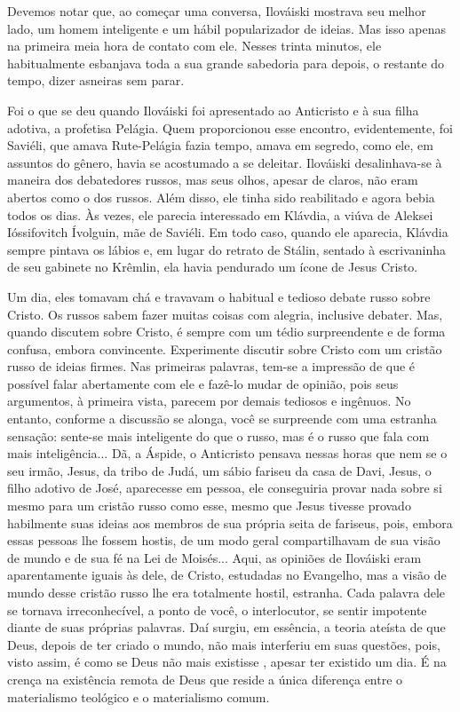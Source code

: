 Devemos notar que, ao começar uma conversa, Ilováiski mostrava seu
melhor lado, um homem inteligente e um hábil popularizador de ideias.
Mas isso apenas na primeira meia hora de contato com ele. Nesses trinta
minutos, ele habitualmente esbanjava toda a sua grande sabedoria para
depois, o restante do tempo, dizer asneiras sem parar.

Foi o que se deu quando Ilováiski foi apresentado ao Anticristo e à sua
filha adotiva, a profetisa Pelágia. Quem proporcionou esse encontro,
evidentemente, foi Saviéli, que amava Rute-Pelágia fazia tempo, amava em
segredo, como ele, em assuntos do gênero, havia se acostumado a se
deleitar. Ilováiski desalinhava-se à maneira dos debatedores russos, mas
seus olhos, apesar de claros, não eram abertos como o dos russos. Além
disso, ele tinha sido reabilitado e agora bebia todos os dias. Às vezes,
ele parecia interessado em Klávdia, a viúva de Aleksei Ióssifovitch
Ívolguin, mãe de Saviéli. Em todo caso, quando ele aparecia, Klávdia
sempre pintava os lábios e, em lugar do retrato de Stálin, sentado à
escrivaninha de seu gabinete no Krêmlin, ela havia pendurado um ícone de
Jesus Cristo.

Um dia, eles tomavam chá e travavam o habitual e tedioso debate russo
sobre Cristo. Os russos sabem fazer muitas coisas com alegria, inclusive
debater. Mas, quando discutem sobre Cristo, é sempre com um tédio
surpreendente e de forma confusa, embora convincente. Experimente
discutir sobre Cristo com um cristão russo de ideias firmes. Nas
primeiras palavras, tem-se a impressão de que é possível falar
abertamente com ele e fazê-lo mudar de opinião, pois seus argumentos, à
primeira vista, parecem por demais tediosos e ingênuos. No entanto,
conforme a discussão se alonga, você se surpreende com uma estranha
sensação: sente-se mais inteligente do que o russo, mas é o russo que
fala com mais inteligência... Dã, a Áspide, o Anticristo pensava nessas
horas que nem se o seu irmão, Jesus, da tribo de Judá, um sábio fariseu
da casa de Davi, Jesus, o filho adotivo de José, aparecesse em pessoa,
ele conseguiria provar nada sobre si mesmo para um cristão russo como
esse, mesmo que Jesus tivesse provado habilmente suas ideias aos membros
de sua própria seita de fariseus, pois, embora essas pessoas lhe fossem
hostis, de um modo geral compartilhavam de sua visão de mundo e de sua
fé na Lei de Moisés... Aqui, as opiniões de Ilováiski eram aparentamente
iguais às dele, de Cristo, estudadas no Evangelho, mas a visão de mundo
desse cristão russo lhe era totalmente hostil, estranha. Cada palavra
dele se tornava irreconhecível, a ponto de você, o interlocutor, se
sentir impotente diante de suas próprias palavras. Daí surgiu, em
essência, a teoria ateísta de que Deus, depois de ter criado o mundo,
não mais interferiu em suas questões, pois, visto assim, é como se Deus
não mais existisse , apesar ter existido um dia. É na crença na
existência remota de Deus que reside a única diferença entre o
materialismo teológico e o materialismo comum.

